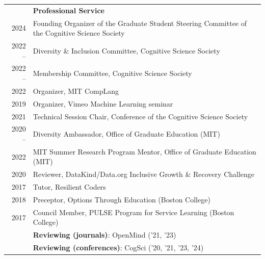 \documentclass[letterpaper, 11pt]{article}
\newcommand{\headingfont}{\Large
\color{Black}}
\newcommand{\SectionHeading}[2][0pt]{ & {\headingfont\textbf{#2}}\\[#1] }
\newenvironment{SectionTableBase}[1]{%
\renewcommand{\arraystretch}{#1}%
\setlength{\tabcolsep}{10pt}%
\begin{longtable}{Rp{5.2in}} }{%
\end{longtable}
\vspace{-.3cm}
}
\newenvironment{SectionTableSingleSpace}{\begin{SectionTableBase}{1.2}}{\end{SectionTableBase}}
\begin{document}
\begin{SectionTableSingleSpace}
    \SectionHeading{Professional Service}

    2024 & Founding Organizer of the Graduate Student Steering Committee of the
    Cognitive Science Society \\

    2022 -- & Diversity \& Inclusion Committee, Cognitive Science Society \\

    2022 -- & Membership Committee, Cognitive Science Society \\

    2022 & Organizer, MIT CompLang \\

    2019 & Organizer, Vimeo Machine Learning seminar \\

    2021 & Technical Session Chair, Conference of the Cognitive Science Society
    \\

    2020 -- & Diversity Ambassador, Office of Graduate Education (MIT) \\

    2022 & MIT Summer Research Program Mentor, Office of Graduate Education
    (MIT)\\

    2020 & Reviewer, DataKind/Data.org Inclusive Growth \& Recovery Challenge\\

    2017 & Tutor, Resilient Coders \\

    2018 & Preceptor, Options Through Education (Boston College) \\

    2017 & Council Member, PULSE Program for Service Learning (Boston College)
    \\

    & \textbf{Reviewing (journals)}: OpenMind ('21, '23) \\

    & \textbf{Reviewing (conferences)}: CogSci ('20, '21, '23, '24)
\end{SectionTableSingleSpace}
\end{document}
